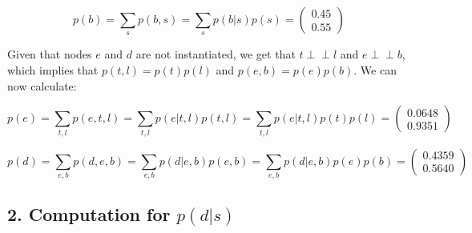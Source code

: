 \documentclass[11pt,a4paper,oneside]{report}
\newcommand\ci{\perp\!\!\!\perp} %
\begin{document}
$$p(b) = \sum_{s}p(b,s) = \sum_{s}p(b|s)p(s) = 
\begin{pmatrix}
   0.45\\
   0.55
\end{pmatrix}
$$

Given that nodes $e$ and $d$ are not instantiated, we get that $t \ci l$ and $e 
\ci b$, which implies that $p(t,l) = p(t)p(l)$ and $p(e,b)=p(e)p(b)$. We can 
now calculate:

$$p(e) = \sum_{t,l}p(e,t,l) = \sum_{t,l}p(e|t,l)p(t,l) = 
\sum_{t,l}p(e|t,l)p(t)p(l) = 
\begin{pmatrix}
   0.0648\\
   0.9351
\end{pmatrix}
$$

$$p(d) = \sum_{e,b}p(d,e,b) = \sum_{e,b}p(d|e,b)p(e,b) = 
\sum_{e,b}p(d|e,b)p(e)p(b) = 
\begin{pmatrix}
   0.4359\\
   0.5640
\end{pmatrix}
$$
 
% 
% 

\subsection*{2. Computation for $p(d|s)$}
\end{document}
